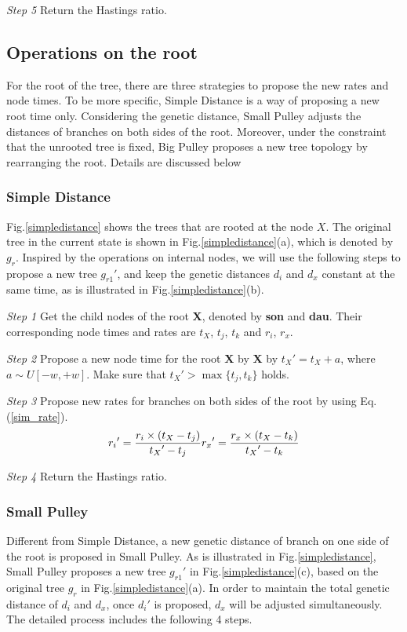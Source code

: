 \documentclass{bmcart}
\begin{document}
\emph{Step 5} Return the Hastings ratio.
\subsection*{Operations on the root}
For the root of the tree, there are three strategies to propose the new rates and node times. To be more specific, Simple Distance is a way of proposing a new root time only. Considering the genetic distance, Small Pulley adjusts the distances of branches on both sides of the root. Moreover, under the constraint that the unrooted tree is fixed, Big Pulley proposes a new tree topology by rearranging the root.  Details are discussed below
\subsubsection*{Simple Distance}
Fig.\ref{simpledistance} shows the trees that are rooted at the node $X$. The original tree in the current state is shown in Fig.\ref{simpledistance}(a), which is denoted by $g_r$. Inspired by the operations on internal nodes, we will use the following steps to propose a new tree ${g_{r1}}'$, and keep the genetic distances $d_i$ and $d_x$ constant at the same time, as is illustrated in Fig.\ref{simpledistance}(b).

\emph{Step 1} Get the child nodes of the root \textbf{X}, denoted by \textbf{son} and \textbf{dau}. Their corresponding node times and rates are $t_X$, $t_j$, $t_k$ and $r_i$, $r_x$.

\emph{Step 2} Propose a new node time for the root \textbf{X} by \textbf{X} by ${t_X}' = {t_X} + a$, where $a \sim U[ - w, + w]$. Make sure that ${t_X}' > \max \{ {t_j},{t_k}\} $ holds.

\emph{Step 3} Propose new rates for branches on both sides of the root by using Eq.(\ref{sim_rate}).
\begin{equation}
\label{sim_rate}
{r_i}' = \frac{{{r_i} \times ({{t_X} - {t_j}})}}{{{t_X}' - {t_j}}}\\
{r_x}' = \frac{{{r_x} \times ({{t_X} - {t_k}})}}{{{t_X}' - {t_k}}}
 \end{equation}

\emph{Step 4} Return the Hastings ratio.
\subsubsection*{Small Pulley}
Different from Simple Distance, a new genetic distance of branch on one side of the root is proposed in Small Pulley. As is illustrated in Fig.\ref{simpledistance}, Small Pulley proposes a new tree ${g_{r1}}'$ in Fig.\ref{simpledistance}(c), based on the original tree $g_r$ in Fig.\ref{simpledistance}(a). In order to maintain the total genetic distance of $d_i$ and $d_x$, once ${d_i}'$ is proposed, $d_x$ will be adjusted simultaneously. The detailed process includes the following 4 steps.
\end{document}
